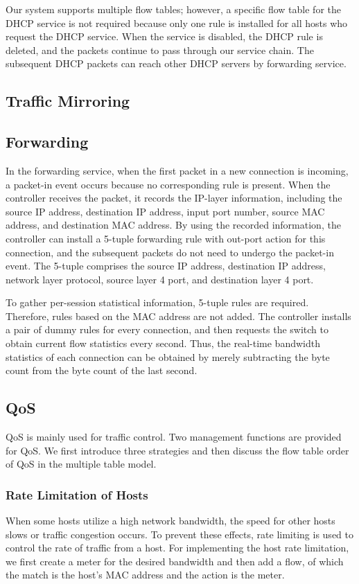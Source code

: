 \documentclass[conference]{IEEEtran}
\begin{document}
Our system supports multiple flow tables; however, a specific flow table for the DHCP service is not required because only one rule is installed for all hosts who request the DHCP service. When the service is disabled, the DHCP rule is deleted, and the packets continue to pass through our service chain. The subsequent DHCP packets can reach other DHCP servers by forwarding service.


\subsection{Traffic Mirroring} \label{ssec:mirror}

\subsection{Forwarding} \label{ssec:forwarding}
In the forwarding service, when the first packet in a new connection is incoming, a packet-in event occurs because no corresponding rule is present. When the controller receives the packet, it records the IP-layer information, including the source IP address, destination IP address, input port number, source MAC address, and destination MAC address. By using the recorded information, the controller can install a 5-tuple forwarding rule with out-port action for this connection, and the subsequent packets do not need to undergo the packet-in event. The 5-tuple comprises the source IP address, destination IP address, network layer protocol, source layer 4 port, and destination layer 4 port.

To gather per-session statistical information, 5-tuple rules are required. Therefore, rules based on the MAC address are not added. The controller installs a pair of dummy rules for every connection, and then requests the switch to obtain current flow statistics every second. Thus, the real-time bandwidth statistics of each connection can be obtained by merely subtracting the byte count from the byte count of the last second.



\subsection{QoS}
QoS is mainly used for traffic control. Two management functions are provided for QoS. We first introduce three strategies and then discuss the flow table order of QoS in the multiple table model.

\subsubsection{Rate Limitation of Hosts}
When some hosts utilize a high network bandwidth, the speed for other hosts slows or traffic congestion occurs. To prevent these effects, rate limiting is used to control the rate of traffic from a host. For implementing the host rate limitation, we first create a meter for the desired bandwidth and then add a flow, of which the match is the host’s MAC address and the action is the meter.
\end{document}
